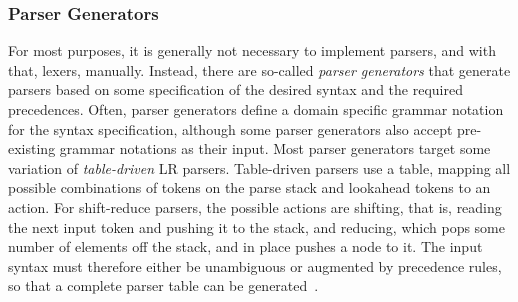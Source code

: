 \subsubsection{Parser Generators}\label{sec:parser_generators}

For most purposes, it is generally not necessary to implement parsers, and with that, lexers, manually.
Instead, there are so-called \emph{parser generators} that generate parsers based on some specification of the desired syntax and the required precedences.
Often, parser generators define a domain specific grammar notation for the syntax specification, although some parser generators also accept pre-existing grammar notations as their input.
Most parser generators target some variation of \emph{table-driven} LR parsers.
Table-driven parsers use a table, mapping all possible combinations of tokens on the parse stack and lookahead tokens to an action.
For shift-reduce parsers, the possible actions are shifting, that is, reading the next input token and pushing it to the stack, and reducing, which pops some number of elements off the stack, and in place pushes a node to it.
The input syntax must therefore either be unambiguous or augmented by precedence rules, so that a complete parser table can be generated~\cite[pp.~76--81]{Jeffery2021}.
